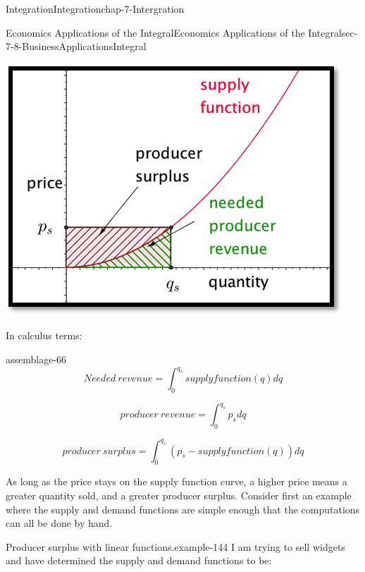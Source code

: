 \documentclass[oneside,10pt,]{book}
\numberwithin{equation}{section}
\begin{document}
\begin{chapterptx}{Integration}{}{Integration}{}{}{chap-7-Intergration}
\begin{sectionptx}{Economics Applications of the Integral}{}{Economics Applications of the Integral}{}{}{sec-7-8-BusinessApplicationsIntegral}
\begin{sidebyside}{1}{0.25}{0.25}{0}%
\begin{sbspanel}{0.5}%
\includegraphics[width=1\linewidth]{images/sec7-8-3.png}
\end{sbspanel}%
\end{sidebyside}%
\par
\hypertarget{p-3081}{}%
In calculus terms:%
\begin{assemblage}{}{assemblage-66}%
\hypertarget{p-3082}{}%
%
\begin{equation*}
Needed\ revenue= \int_0^{q_s} supply function(q) dq
\end{equation*}
%
\par
\hypertarget{p-3083}{}%
%
\begin{equation*}
producer\ revenue= \int_0^{q_s} p_s  dq
\end{equation*}
%
\par
\hypertarget{p-3084}{}%
%
\begin{equation*}
producer\ surplus= \int_0^{q_s} ( p_s-supply function(q))  dq
\end{equation*}
%
\end{assemblage}
\hypertarget{p-3085}{}%
As long as the price stays on the supply function curve, a higher price means a greater quantity sold, and a greater producer surplus.    Consider first an example where the supply and demand functions are simple enough that the computations can all be done by hand.%
\begin{example}{Producer surplus with linear functions.}{example-144}%
\hypertarget{p-3086}{}%
I am trying to sell widgets and have determined the supply and demand functions to be:%

\end{example}
\end{sectionptx}
\end{chapterptx}
\end{document}
